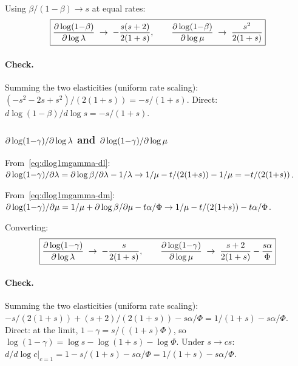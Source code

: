 Using $\beta/(1-\beta) \to s$ at equal rates:
\begin{equation}
\boxed{
\frac{\partial\log(1{-}\beta)}{\partial\log\lambda}
  \;\to\; -\frac{s(s+2)}{2(1+s)},
\qquad
\frac{\partial\log(1{-}\beta)}{\partial\log\mu}
  \;\to\; \frac{s^2}{2(1+s)}}
\label{eq:log1mbeta-elasticity-limit}
\end{equation}

\paragraph{Check.} Summing the two elasticities (uniform rate scaling):
$(-s^2{-}2s{+}s^2)/(2(1{+}s)) = -s/(1{+}s)$.
Direct: $d\log(1{-}\beta)/d\log s = -s/(1{+}s)$.  \checkmark

\subsubsection{\texorpdfstring{$\partial\log(1{-}\gamma)/\partial\log\lambda$ and
$\partial\log(1{-}\gamma)/\partial\log\mu$}{partial log(1-gamma) / partial log lambda and partial log(1-gamma) / partial log mu}}

From~\eqref{eq:dlog1mgamma-dl}:
$\partial\log(1{-}\gamma)/\partial\lambda
= \partial\log\beta/\partial\lambda - 1/\lambda
\to 1/\mu - t/(2(1{+}s)) - 1/\mu
= -t/(2(1{+}s))$.

From~\eqref{eq:dlog1mgamma-dm}:
$\partial\log(1{-}\gamma)/\partial\mu
= 1/\mu + \partial\log\beta/\partial\mu
  - t\alpha/\Phi
\to 1/\mu - t/(2(1{+}s)) - t\alpha/\Phi$.

Converting:
\begin{equation}
\boxed{
\frac{\partial\log(1{-}\gamma)}{\partial\log\lambda}
  \;\to\; -\frac{s}{2(1+s)},
\qquad
\frac{\partial\log(1{-}\gamma)}{\partial\log\mu}
  \;\to\; \frac{s+2}{2(1+s)} - \frac{s\alpha}{\Phi}}
\label{eq:log1mgamma-elasticity-limit}
\end{equation}

\paragraph{Check.} Summing the two elasticities (uniform rate scaling):
$-s/(2(1{+}s)) + (s{+}2)/(2(1{+}s)) - s\alpha/\Phi
= 1/(1{+}s) - s\alpha/\Phi$.
Direct: at the limit, $1-\gamma = s/((1{+}s)\Phi)$, so
$\log(1{-}\gamma) = \log s - \log(1{+}s) - \log\Phi$.
Under $s \to cs$:
$d/d\log c|_{c=1} = 1 - s/(1{+}s) - s\alpha/\Phi
= 1/(1{+}s) - s\alpha/\Phi$.  \checkmark

